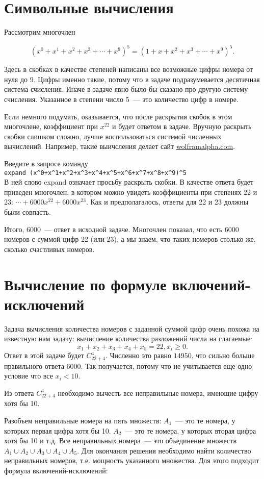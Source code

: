 \documentclass{article}
\begin{document}
\section{Символьные вычисления}
Рассмотрим многочлен

$$(x^0+x^1+x^2+x^3+\cdots+x^9)^5=(1+x+x^2+x^3+\cdots+x^9)^5.$$

Здесь в скобках в качестве степеней написаны все возможные цифры номера от нуля до 9. Цифры именно такие, потому что в задаче подразумевается десятичная система счисления. Иначе в задаче явно было бы сказано про другую систему счисления. Указанное в степени число 5~--- это количество цифр в номере.

Если немного подумать, оказывается, что после раскрытия скобок в этом многочлене, коэффициент при $x^{22}$ и будет ответом в задаче. Вручную раскрыть скобки слишком сложно, лучше воспользоваться системой численных вычислений. Например, такие выичсления делает сайт \url{wolframalpha.com}.

Введите в запросе команду\\
\verb|expand (x^0+x^1+x^2+x^3+x^4+x^5+x^6+x^7+x^8+x^9)^5|\\
В ней слово expand означает просьбу раскрыть скобки.
В качестве ответа будет приведен многочлен, в котором можно увидеть коэффициенты при степенях 22 и 23: $\cdots+6000x^22+6000x^23$. Как и предполагалось, ответы для 22 и 23 должны были совпасть.

Итого, 6000~--- ответ в исходной задаче. Многочлен показал, что есть 6000 номеров с суммой цифр 22 (или 23), а мы знаем, что таких номеров столько же, сколько счастливых номеров.

\section{Вычисление по формуле включений-исключений}

Задача вычисления количества номеров с заданной суммой цифр очень похожа на известную нам задачу: вычисление количества разложений числа на слагаемые:
$$x_1+x_2+x_3+x_4+x_5=22, x_i\ge 0.$$
Ответ в этой задаче будет $C_{22+4}^4$. Численно это равно $14950$, что сильно больше правильного ответа $6000$. Так получается, потому что не учитывается еще одно условие что все $x_i<10$.

Из ответа $C_{22+4}^4$ необходимо вычесть все неправильные номера, имеющие цифру хотя бы 10.

Разобъем неправильные номера на пять множеств: $A_1$~--- это те номера, у которых первая цифра хотя бы 10. $A_2$~--- это те номера, у которых вторая цифра хотя бы 10 и т.д. Все неправильных номера~--- это объединение множеств $A_1\cup A_2\cup A_3\cup A_4\cup A_5$. Для окончания решения необходимо найти количество неправильных номеров, т.е. мощность указанного множества. Для этого подходит формула включений-исключений:
\end{document}
